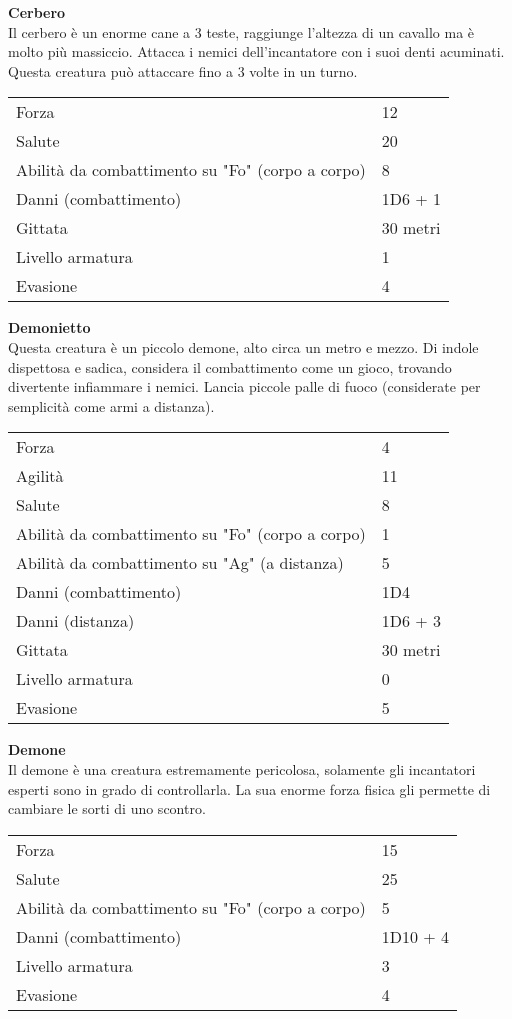 \documentclass[../manuale_main.tex]{subfiles}
\begin{document}
\begin{center}

\textbf{Cerbero}\\
Il cerbero è un enorme cane a 3 teste, raggiunge l'altezza di un cavallo ma è molto più massiccio. Attacca i nemici dell'incantatore con i suoi denti acuminati. Questa creatura può attaccare fino a 3 volte in un turno.
\renewcommand{\arraystretch}{1.2}
\begin{tabularx}{\linewidth}{Q F}
Forza&12\\
Salute&20\\
Abilità da combattimento su "Fo" (corpo a corpo)&8\\
Danni (combattimento)&1D6 + 1\\
Gittata&30 metri\\
Livello armatura&1\\
Evasione&4\\
\end{tabularx}

\textbf{Demonietto}\\
Questa creatura è un piccolo demone, alto circa un metro e mezzo. Di indole dispettosa e sadica, considera il combattimento come un gioco, trovando divertente infiammare i nemici. Lancia piccole palle di fuoco (considerate per semplicità come armi a distanza).
\renewcommand{\arraystretch}{1.2}
\begin{tabularx}{\linewidth}{Q F}
Forza&4\\
Agilità&11\\
Salute&8\\
Abilità da combattimento su "Fo" (corpo a corpo)&1\\
Abilità da combattimento su "Ag" (a distanza)&5\\
Danni (combattimento)&1D4\\
Danni (distanza)&1D6 + 3\\
Gittata&30 metri\\
Livello armatura&0\\
Evasione&5\\
\end{tabularx}

\textbf{Demone}\\
Il demone è una creatura estremamente pericolosa, solamente gli incantatori esperti sono in grado di controllarla. La sua enorme forza fisica gli permette di cambiare le sorti di uno scontro.
\renewcommand{\arraystretch}{1.2}
\begin{tabularx}{\linewidth}{Q F}
Forza&15\\
Salute&25\\
Abilità da combattimento su "Fo" (corpo a corpo)&5\\
Danni (combattimento)&1D10 + 4\\
Livello armatura&3\\
Evasione&4\\
\end{tabularx}


\end{center}
\end{document}
